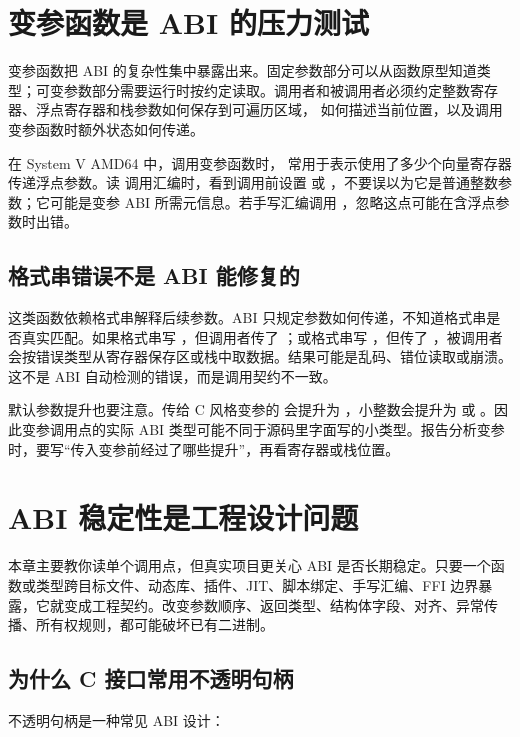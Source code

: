 \section{变参函数是 ABI 的压力测试}

变参函数把 ABI 的复杂性集中暴露出来。固定参数部分可以从函数原型知道类型；可变参数部分需要运行时按约定读取。调用者和被调用者必须约定整数寄存器、浮点寄存器和栈参数如何保存到可遍历区域， 如何描述当前位置，以及调用变参函数时额外状态如何传递。

在 System V AMD64 中，调用变参函数时， 常用于表示使用了多少个向量寄存器传递浮点参数。读  调用汇编时，看到调用前设置  或 ，不要误以为它是普通整数参数；它可能是变参 ABI 所需元信息。若手写汇编调用 ，忽略这点可能在含浮点参数时出错。

\subsection{格式串错误不是 ABI 能修复的}

 这类函数依赖格式串解释后续参数。ABI 只规定参数如何传递，不知道格式串是否真实匹配。如果格式串写 ，但调用者传了 ；或格式串写 ，但传了 ，被调用者会按错误类型从寄存器保存区或栈中取数据。结果可能是乱码、错位读取或崩溃。这不是 ABI 自动检测的错误，而是调用契约不一致。

默认参数提升也要注意。传给 C 风格变参的  会提升为 ，小整数会提升为  或 。因此变参调用点的实际 ABI 类型可能不同于源码里字面写的小类型。报告分析变参时，要写“传入变参前经过了哪些提升”，再看寄存器或栈位置。

\section{ABI 稳定性是工程设计问题}

本章主要教你读单个调用点，但真实项目更关心 ABI 是否长期稳定。只要一个函数或类型跨目标文件、动态库、插件、JIT、脚本绑定、手写汇编、FFI 边界暴露，它就变成工程契约。改变参数顺序、返回类型、结构体字段、对齐、异常传播、所有权规则，都可能破坏已有二进制。

\subsection{为什么 C 接口常用不透明句柄}

不透明句柄是一种常见 ABI 设计：


